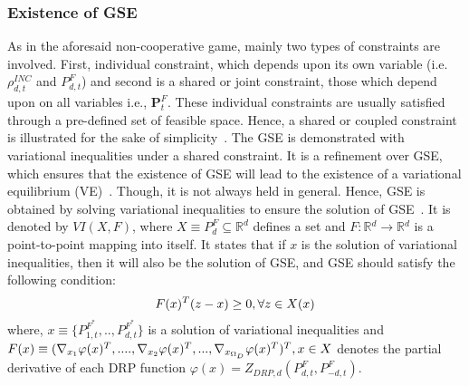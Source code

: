 \documentclass[journal]{IEEEtran}
\begin{document}
\subsubsection{Existence of GSE}
As in the aforesaid non-cooperative game, mainly two types of constraints are involved. First, individual constraint, which depends upon its own variable (i.e. $\rho _{d,t}^{INC}$ and $P_{d,t}^F$) and second is a shared or joint constraint, those which depend upon on all variables i.e., $\boldsymbol{P}_t^F$. These individual constraints are usually satisfied through a pre-defined set of feasible space. Hence, a shared or coupled constraint is illustrated for the sake of simplicity~\cite{facchinei2007generalized}. The GSE is demonstrated with variational inequalities under a shared constraint. It is a refinement over GSE, which ensures that the existence of GSE will lead to the existence of a variational equilibrium (VE)~\cite{facchinei2007generalized,kulkarni2014shared}. Though, it is not always held in general. Hence, GSE is obtained by solving variational inequalities to ensure the solution of GSE~\cite{facchinei2007generalized}. It is denoted by $VI(X,F)$, where $X \equiv P_d^F \subseteq {\mathbb{R}}^{d}$  defines a set and  $F:\mathbb{R}{^d} \to \mathbb{R}{^d}$ is a point-to-point mapping into itself. It states that if $x$ is the solution of variational inequalities, then it will also be the solution of GSE, and GSE should satisfy the following condition: 
\begin{equation}
F{(x)^T}(z - x) \ge 0,{\rm{   }}\forall {\rm{ }}z \in X(x)
\end{equation}where, $x \equiv \{P_{1,t}^{F^{*}},..,P_{d,t}^{F^{*}}\}$ is a solution of variational inequalities and $F(x) \equiv {({\nabla _{{x_1}}}\varphi {(x)^T},....,{\nabla _{{x_2}}}\varphi {(x)^T},...,{\nabla _{{x_{{\Omega _D}}}}}\varphi {(x)^T})^T},{\rm{   }}x \in X$ denotes the partial derivative of each DRP function $\varphi (x) = {Z_{DRP,d}}(P_{d,t}^F,P_{ - d,t}^F)$.
\end{document}
